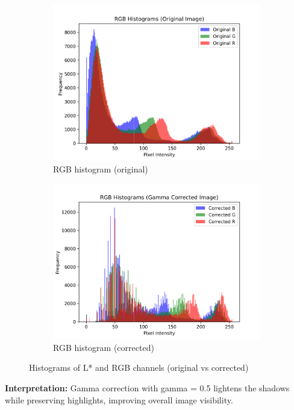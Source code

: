 \documentclass[10pt,a4paper]{article}
\begin{document}
\begin{figure}[htbp]
\begin{subfigure}[t]{.24\linewidth}
    \includegraphics[width=\linewidth]{task3/RGB_histogram_original.png}
    \caption{RGB histogram (original)}
  \end{subfigure}\hfill
  \begin{subfigure}[t]{.24\linewidth}\centering
    \includegraphics[width=\linewidth]{task3/RGB_histogram_corrected.png}
    \caption{RGB histogram (corrected)}
  \end{subfigure}
  \caption{Histograms of L* and RGB channels (original vs corrected)}
\end{figure}



\textbf{Interpretation:} Gamma correction with gamma = 0.5 lightens the shadows while preserving highlights, improving overall image visibility.
\end{document}
